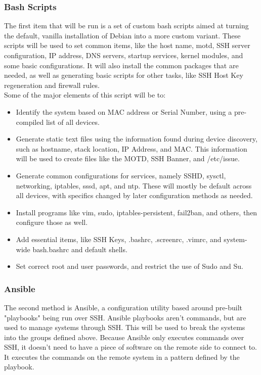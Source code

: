 \documentclass[12pt]{spieman}  %
\begin{document}
\subsubsection{Bash Scripts}
The first item that will be run is a set of custom bash scripts aimed at turning the default, vanilla installation of Debian into a more custom variant. These scripts will be used to set common items, like the host name, motd, SSH server configuration, IP address, DNS servers, startup services, kernel modules, and some basic configurations. It will also install the common packages that are needed, as well as generating basic scripts for other tasks, like SSH Host Key regeneration and firewall rules.\\

Some of the major elements of this script will be to:
\begin{itemize}
\item Identify the system based on MAC address or Serial Number, using a pre-compiled list of all devices.
\item Generate static text files using the information found during device discovery, such as hostname, stack location, IP Address, and MAC. This information will be used to create files like the MOTD, SSH Banner, and /etc/issue.
\item Generate common configurations for services, namely SSHD, sysctl, networking, iptables, sssd, apt, and ntp. These will mostly be default across all devices, with specifics changed by later configuration methods as needed.
\item Install programs like vim, sudo, iptables-persistent, fail2ban, and others, then configure those as well.
\item Add essential items, like SSH Keys, .bashrc, .screenrc, .vimrc, and system-wide bash.bashrc and default shells.
\item Set correct root and user passwords, and restrict the use of Sudo and Su.
\end{itemize}

\subsubsection{Ansible}
The second method is Ansible, a configuration utility based around pre-built "playbooks" being run over SSH. Ansible playbooks aren't commands, but are used to manage systems through SSH. This will be used to break the systems into the groups defined above. Because Ansible only executes commands over SSH, it doesn't need to have a piece of software on the remote side to connect to. It executes the commands on the remote system in a pattern defined by the playbook.\\
\end{document}
